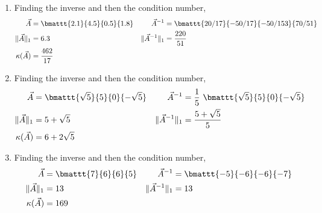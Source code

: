 \begin{enumerate}
    \item Finding the inverse and then the condition number,
          \begin{align}
              \vec{A}                      & = \bmattt{2.1}{4.5}{0.5}{1.8} &
              \vec{A}^{-1}                 & = \bmattt{20/17}{-50/17}
              {-50/153}{70/51}                                               \\
              \lVert \vec{A} \rVert_1      & = 6.3                         &
              \lVert \vec{A}^{-1} \rVert_1 & = \frac{220}{51}                \\
              \kappa(\vec{A})              & = \frac{462}{17}
          \end{align}

    \item Finding the inverse and then the condition number,
          \begin{align}
              \vec{A}                      & = \bmattt{\sqrt{5}}{5}{0}{-\sqrt{5}} &
              \vec{A}^{-1}                 & = \frac{1}{5}
              \ \bmattt{\sqrt{5}}{5}{0}{-\sqrt{5}}                                  \\
              \lVert \vec{A} \rVert_1      & = 5 + \sqrt{5}                       &
              \lVert \vec{A}^{-1} \rVert_1 & = \frac{5 + \sqrt{5}}{5}               \\
              \kappa(\vec{A})              & = 6 + 2\sqrt{5}
          \end{align}

    \item Finding the inverse and then the condition number,
          \begin{align}
              \vec{A}                      & = \bmattt{7}{6}{6}{5}     &
              \vec{A}^{-1}                 & = \bmattt{-5}{-6}{-6}{-7}   \\
              \lVert \vec{A} \rVert_1      & = 13                      &
              \lVert \vec{A}^{-1} \rVert_1 & = 13                        \\
              \kappa(\vec{A})              & = 169
          \end{align}


\end{enumerate}
